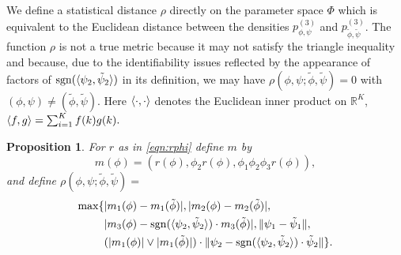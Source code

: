 \documentclass[journal]{IEEEtran}
\newtheorem{proposition}{Proposition}
\newcommand{\sgn}{\mathrm{sgn}}
\newcommand{\1}{\boldsymbol{1}}
\DeclareMathOperator{\sign}{sgn}
\DeclarePairedDelimiter{\Inner}{\langle}{\rangle}
\DeclarePairedDelimiter{\ip}{\langle}{\rangle}
\DeclarePairedDelimiter{\norm}{\lVert}{\rVert}
\DeclarePairedDelimiter{\abs}{\lvert}{\rvert}
\newcommand{\RR}{\mathbb{R}}
\begin{document}
	 We define a statistical distance $\rho$ directly on the parameter space $\Phi$ which is equivalent to  the Euclidean distance between the densities $p^{(3)}_{\phi,\psi}$ and $p^{(3)}_{\tilde{\phi},\tilde{\psi}}$. The function $\rho$ is not a true metric because it may not satisfy the triangle inequality and because, due to the identifiability issues reflected by the appearance of factors of $\sign(\ip{\psi_2,\tilde{\psi}_2})$ in its definition, we may have $\rho(\phi,\psi;\tilde{\phi},\tilde{\psi})=0$ with $(\phi,\psi)\neq(\tilde{\phi},\tilde{\psi})$. Here $\ip{\cdot,\cdot}$ denotes the Euclidean inner product on $\RR^K$, \( \ip{f,g}=\sum_{i=1}^K f(k)g(k).\)
	\begin{proposition}
		\label{pro:local-equivalence}
		For $r$ as in \cref{eqn:rphi} define $m$ by
		\begin{equation}\label{eqn:m}
			m(\phi)=(r(\phi),\phi_2 r(\phi), \phi_1 \phi_2 \phi_3 r(\phi) ),
		\end{equation}
		and define $\rho(\phi,\psi;\tilde{\phi},\tilde{\psi})=$
		\begin{equation}
	\label{eq:131}
	\begin{aligned}
		\max\{%
		&\abs{m_1(\phi) - m_1(\tilde{\phi})},\abs{m_2(\phi) - m_2(\tilde{\phi})},\,\\
		&\abs{m_3(\phi) - \sgn(\ip{\psi_2,\tilde{\psi}_2})\cdot m_3(\tilde{\phi})}, \norm{\psi_1 - \tilde{\psi}_1}, \\
		&(\abs{m_1(\phi)}\vee\abs{m_1(\tilde{\phi})})\cdot\norm{\psi_2 - \sgn(\Inner{\psi_2,\tilde{\psi}_2})\cdot \tilde{\psi}_2} \}.%
	\end{aligned}%
\end{equation}

\end{proposition}
\end{document}
